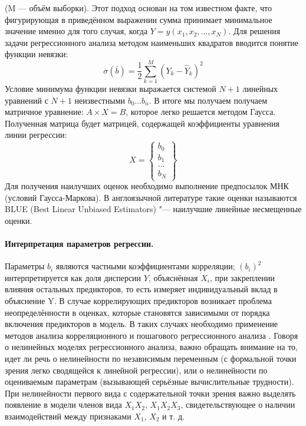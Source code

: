 (M — объём выборки). Этот подход основан на том известном факте, что фигурирующая в приведённом выражении сумма принимает минимальное значение именно для того случая, когда $Y = y(x_1,x_2,...,x_N)$.
Для решения задачи регрессионного анализа методом наименьших квадратов вводится понятие функции невязки:
\begin{equation}
\sigma(\bar{b}) = \frac{1}{2} \sum\limits_{k=1}^{M}{(Y_k - \hat{Y}_k)^2}
\end{equation}
Условие минимума функции невязки выражается системой $N+1$  линейных уравнений с $N+1$ неизвестными $b_0...b_n$.
В итоге мы получаем получаем матричное уравнение: $A \times X = B$, которое легко решается методом Гаусса. Полученная матрица будет матрицей, содержащей коэффициенты уравнения линии регрессии:
\begin{equation}
X = \left\{ \begin{array}{c}
b_0\\
b_1\\
...\\
b_N
\end{array} \right\}
\end{equation}
Для получения наилучших оценок необходимо выполнение предпосылок МНК (условий Гаусса-Маркова). В англоязычной литературе такие оценки называются BLUE (Best Linear Unbiased Estimators) "--- наилучшие линейные несмещенные оценки.

\paragraph{Интерпретация параметров регрессии.}

Параметры $b_i$ являются частными коэффициентами корреляции; $(b_i)^2$ интерпретируется как доля дисперсии $Y$, объяснённая $X_i$, при закреплении влияния остальных предикторов, то есть измеряет индивидуальный вклад  в объяснение Y. В случае коррелирующих предикторов возникает проблема неопределённости в оценках, которые становятся зависимыми от порядка включения предикторов в модель. В таких случаях необходимо применение методов анализа корреляционного и пошагового регрессионного анализа \cite{statseval}.
Говоря о нелинейных моделях регрессионного анализа, важно обращать внимание на то, идет ли речь о нелинейности по независимым переменным (с формальной точки зрения легко сводящейся к линейной регрессии), или о нелинейности по оцениваемым параметрам (вызывающей серьёзные вычислительные трудности). При нелинейности первого вида с содержательной точки зрения важно выделять появление в модели членов вида $X_1 X_2$, $X_1 X_2 X_3$, свидетельствующее о наличии взаимодействий между признаками $X_1$, $X_2$ и т. д.

